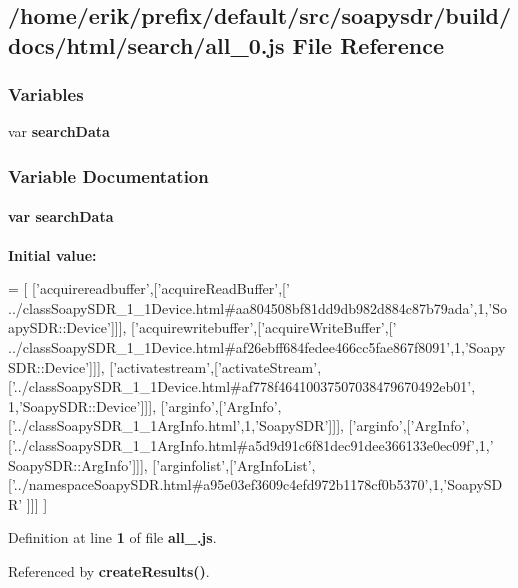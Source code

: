 \subsection{/home/erik/prefix/default/src/soapysdr/build/docs/html/search/all\+\_\+0.js File Reference}
\label{all__0_8js}
\subsubsection*{Variables}
\begin{DoxyCompactItemize}
\item 
var {\bf search\+Data}
\end{DoxyCompactItemize}


\subsubsection{Variable Documentation}
\paragraph[{search\+Data}]{\setlength{\rightskip}{0pt plus 5cm}var search\+Data}\label{all__0_8js_ad01a7523f103d6242ef9b0451861231e}
{\bfseries Initial value\+:}
\begin{DoxyCode}
=
[
  [\textcolor{stringliteral}{'acquirereadbuffer'},[\textcolor{stringliteral}{'acquireReadBuffer'},[\textcolor{stringliteral}{'
      ../classSoapySDR\_1\_1Device.html#aa804508bf81dd9db982d884c87b79ada'},1,\textcolor{stringliteral}{'SoapySDR::Device'}]]],
  [\textcolor{stringliteral}{'acquirewritebuffer'},[\textcolor{stringliteral}{'acquireWriteBuffer'},[\textcolor{stringliteral}{'
      ../classSoapySDR\_1\_1Device.html#af26ebff684fedee466cc5fae867f8091'},1,\textcolor{stringliteral}{'SoapySDR::Device'}]]],
  [\textcolor{stringliteral}{'activatestream'},[\textcolor{stringliteral}{'activateStream'},[\textcolor{stringliteral}{'../classSoapySDR\_1\_1Device.html#af778f46410037507038479670492eb01'},
      1,\textcolor{stringliteral}{'SoapySDR::Device'}]]],
  [\textcolor{stringliteral}{'arginfo'},[\textcolor{stringliteral}{'ArgInfo'},[\textcolor{stringliteral}{'../classSoapySDR\_1\_1ArgInfo.html'},1,\textcolor{stringliteral}{'SoapySDR'}]]],
  [\textcolor{stringliteral}{'arginfo'},[\textcolor{stringliteral}{'ArgInfo'},[\textcolor{stringliteral}{'../classSoapySDR\_1\_1ArgInfo.html#a5d9d91c6f81dec91dee366133e0ec09f'},1,\textcolor{stringliteral}{'
      SoapySDR::ArgInfo'}]]],
  [\textcolor{stringliteral}{'arginfolist'},[\textcolor{stringliteral}{'ArgInfoList'},[\textcolor{stringliteral}{'../namespaceSoapySDR.html#a95e03ef3609c4efd972b1178cf0b5370'},1,\textcolor{stringliteral}{'SoapySDR'}
      ]]]
]
\end{DoxyCode}


Definition at line {\bf 1} of file {\bf all\+\_.\+js}.



Referenced by {\bf create\+Results()}.

